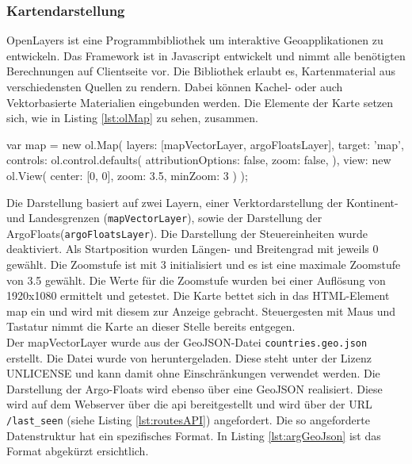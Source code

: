 \subsubsection{Kartendarstellung}

 OpenLayers ist eine Programmbibliothek um interaktive Geoapplikationen zu entwickeln. Das \gls{Framework} ist in Javascript entwickelt und nimmt alle benötigten Berechnungen auf Clientseite vor. Die Bibliothek erlaubt es, Kartenmaterial aus verschiedensten Quellen zu rendern. Dabei können Kachel- oder auch Vektorbasierte Materialien eingebunden werden.
Die Elemente der Karte setzen sich, wie in Listing \ref{lst:olMap} zu sehen, zusammen.

\begin{javascript}[label={lst:olMap}, caption={Das ol.Map Element aus der Kartendarstellung}]
 var map = new ol.Map({
    layers: [mapVectorLayer, argoFloatsLayer],
    target: 'map',
    controls: ol.control.defaults({
        attributionOptions: false,
        zoom: false,
    }),
    view: new ol.View({
        center: [0, 0],
        zoom: 3.5,
        minZoom: 3
    })
});
\end{javascript}

Die Darstellung basiert auf zwei Layern, einer Verktordarstellung der Kontinent- und Landesgrenzen (\texttt{mapVectorLayer}), sowie der Darstellung der ArgoFloats\newline (\texttt{argoFloatsLayer}). Die Darstellung der Steuereinheiten wurde deaktiviert. Als Startposition wurden Längen- und Breitengrad mit jeweils 0 gewählt. Die Zoomstufe ist mit 3 initialisiert und es ist eine maximale Zoomstufe von 3.5 gewählt. Die Werte für die Zoomstufe wurden bei einer Auflösung von 1920x1080 ermittelt und getestet.
Die Karte bettet sich in das HTML-Element map ein und wird mit diesem zur Anzeige gebracht. Steuergesten mit Maus und Tastatur nimmt die Karte an dieser Stelle bereits entgegen.
\\
Der mapVectorLayer wurde aus der GeoJSON-Datei \texttt{countries.geo.json}  erstellt. Die Datei wurde von \cite{sundstrm16} heruntergeladen. Diese steht unter der Lizenz UNLICENSE und kann damit ohne Einschränkungen verwendet werden. Die Darstellung der Argo-Floats wird ebenso über eine GeoJSON realisiert. Diese wird auf dem Webserver über die \gls{api} bereitgestellt und wird über der URL \texttt{/last\_seen}  (siehe Listing \ref{lst:routesAPI}) angefordert. Die so angeforderte Datenstruktur hat ein spezifisches Format. In Listing \ref{lst:argGeoJson} ist das Format abgekürzt ersichtlich.

